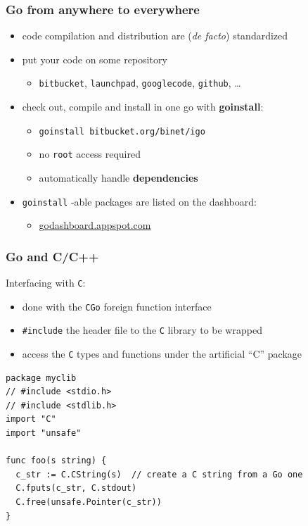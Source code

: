 \documentclass[bigger]{beamer}
\providecommand{\alert}[1]{\textbf{#1}}
\begin{document}
\begin{frame}
\frametitle{Go from anywhere to everywhere}
\label{sec-1-20}


\begin{itemize}
\item code compilation and distribution are (\emph{de facto}) standardized
\item put your code on some repository
\begin{itemize}
\item \verb~bitbucket~, \verb~launchpad~, \verb~googlecode~, \verb~github~, \ldots{}
\end{itemize}
\item check out, compile and install in one go with \alert{goinstall}:
\begin{itemize}
\item \verb~goinstall bitbucket.org/binet/igo~
\item no \verb~root~ access required
\item automatically handle \alert{dependencies}
\end{itemize}
\end{itemize}

\vspace

\begin{itemize}
\item \verb~goinstall~ -able packages are listed on the dashboard:
\begin{itemize}
\item \href{http://godashboard.appspot.com}{godashboard.appspot.com}
\end{itemize}
\end{itemize}
\end{frame}
\begin{frame}[fragile]
\frametitle{Go and C/C++}
\label{sec-1-21}


Interfacing with \verb~C~:

\begin{itemize}
\item done with the \verb~CGo~ foreign function interface
\item \verb~#include~ the header file to the \verb~C~ library to be wrapped
\item access the \verb~C~ types and functions under the artificial ``C'' package
\end{itemize}


\begin{verbatim}
package myclib
// #include <stdio.h>
// #include <stdlib.h>
import "C"
import "unsafe"

func foo(s string) {
  c_str := C.CString(s)  // create a C string from a Go one
  C.fputs(c_str, C.stdout)
  C.free(unsafe.Pointer(c_str))
}
\end{verbatim}
\end{frame}
\end{document}
